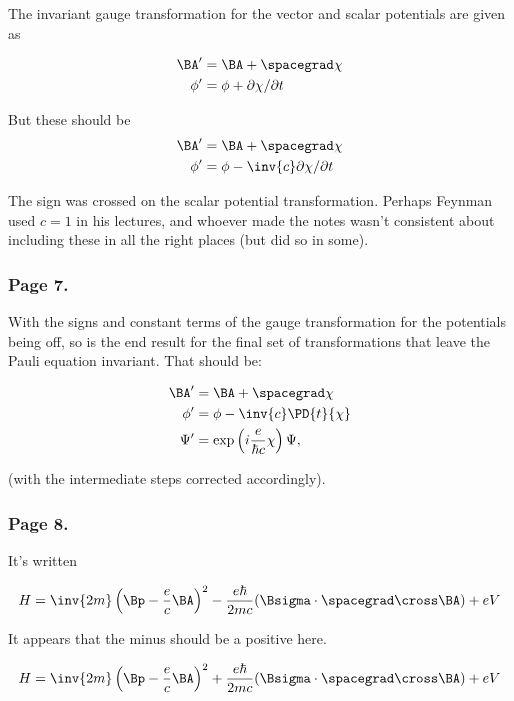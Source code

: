 The invariant gauge transformation for the vector and scalar potentials are given as

\begin{align*}
\BA' &= \BA + \spacegrad \chi \\
\phi' &= \phi + \partial \chi / \partial t
\end{align*}

But these should be
\begin{align*}
\BA' &= \BA + \spacegrad \chi \\
\phi' &= \phi - \inv{c} \partial \chi / \partial t
\end{align*}

The sign was crossed on the scalar potential transformation.  Perhaps Feynman used $c=1$ in his lectures, and whoever made the notes wasn't consistent about including these in all the right places (but did so in some).

\subsubsection{Page 7.}

With the signs and constant terms of the gauge transformation for the potentials being off, so is the end result for the final set of transformations that leave the Pauli equation invariant.  That should be:

\begin{align*}
\BA' &= \BA + \spacegrad \chi \\
\phi' &= \phi - \inv{c} \PD{t}{ \chi } \\
\Psi' &= \exp\left( i \frac{e}{ \hbar c } \chi \right) \Psi,
\end{align*}

(with the intermediate steps corrected accordingly).

\subsubsection{Page 8.}

It's written

\begin{align*}
H = \inv{2m} \left( \Bp - \frac{e}{c}\BA \right)^2 - \frac{e \hbar}{2 m c} (\Bsigma \cdot \spacegrad \cross \BA) + e V
\end{align*}

It appears that the minus should be a positive here.

\begin{align*}
H = \inv{2m} \left( \Bp - \frac{e}{c}\BA \right)^2 + \frac{e \hbar}{2 m c} (\Bsigma \cdot \spacegrad \cross \BA) + e V
\end{align*}

